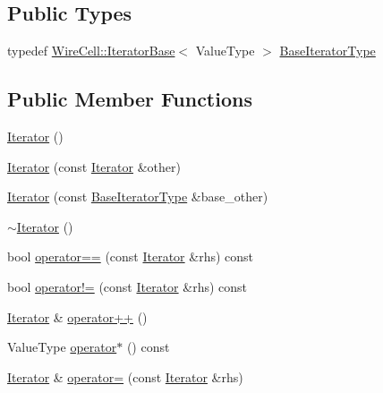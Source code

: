 \subsection*{Public Types}
\begin{DoxyCompactItemize}
\item 
typedef \hyperlink{class_wire_cell_1_1_iterator_base}{Wire\+Cell\+::\+Iterator\+Base}$<$ Value\+Type $>$ \hyperlink{class_wire_cell_1_1_iterator_a06a62ddc776c46b8ff2f26c1e1c90546}{Base\+Iterator\+Type}
\end{DoxyCompactItemize}
\subsection*{Public Member Functions}
\begin{DoxyCompactItemize}
\item 
\hyperlink{class_wire_cell_1_1_iterator_a12de861cdfb0c90393d38996e1327ea9}{Iterator} ()
\item 
\hyperlink{class_wire_cell_1_1_iterator_a0acb021adf538918c1da13ed44ba0db1}{Iterator} (const \hyperlink{class_wire_cell_1_1_iterator}{Iterator} \&other)
\item 
\hyperlink{class_wire_cell_1_1_iterator_a1580729c388237b04a7f94ba538fcb70}{Iterator} (const \hyperlink{class_wire_cell_1_1_iterator_a06a62ddc776c46b8ff2f26c1e1c90546}{Base\+Iterator\+Type} \&base\+\_\+other)
\item 
\hyperlink{class_wire_cell_1_1_iterator_a35d1e64bce3842c639d7452672baae80}{$\sim$\+Iterator} ()
\item 
bool \hyperlink{class_wire_cell_1_1_iterator_a2bbe36ae719997ad6687b968fa7924f0}{operator==} (const \hyperlink{class_wire_cell_1_1_iterator}{Iterator} \&rhs) const
\item 
bool \hyperlink{class_wire_cell_1_1_iterator_a7b3b0221d24e37b96b9c988a41b3a7e8}{operator!=} (const \hyperlink{class_wire_cell_1_1_iterator}{Iterator} \&rhs) const
\item 
\hyperlink{class_wire_cell_1_1_iterator}{Iterator} \& \hyperlink{class_wire_cell_1_1_iterator_a33087f833e9684b9de60c00cf5081e51}{operator++} ()
\item 
Value\+Type \hyperlink{class_wire_cell_1_1_iterator_a4b18762cb1e90376b7cce7d82a808f20}{operator$\ast$} () const
\item 
\hyperlink{class_wire_cell_1_1_iterator}{Iterator} \& \hyperlink{class_wire_cell_1_1_iterator_a54ed727bdcc60aeab52fd8bee3feffa1}{operator=} (const \hyperlink{class_wire_cell_1_1_iterator}{Iterator} \&rhs)
\end{DoxyCompactItemize}


